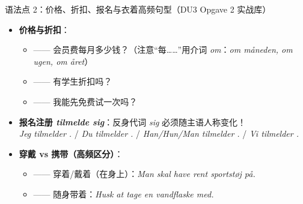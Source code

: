 \begin{grammatikbox}{语法点 2：价格、折扣、报名与衣着高频句型（DU3 Opgave 2 实战库）}
\begin{itemize}
  \item \textbf{价格与折扣}：
    \begin{itemize}
      \item {} —— 会员费每月多少钱？（注意“每……”用介词 \textit{om}：\textit{om måneden, om ugen, om året}）
      \item {} —— 有学生折扣吗？
      \item {} —— 我能先免费试一次吗？
    \end{itemize}
  \item \textbf{报名注册 \textit{tilmelde sig}}：反身代词 \textit{sig} 必须随主语人称变化！\\
    \textit{Jeg tilmelder .} / \textit{Du tilmelder .} / \textit{Han/Hun/Man tilmelder .} / \textit{Vi tilmelder .}
  \item \textbf{穿戴 vs 携带（高频区分）}：
    \begin{itemize}
      \item {} —— 穿着/戴着（在身上）：\textit{Man skal have rent sportstøj på.}
      \item {} —— 随身带着：\textit{Husk at tage en vandflaske med.}
    \end{itemize}
\end{itemize}
\end{grammatikbox}


